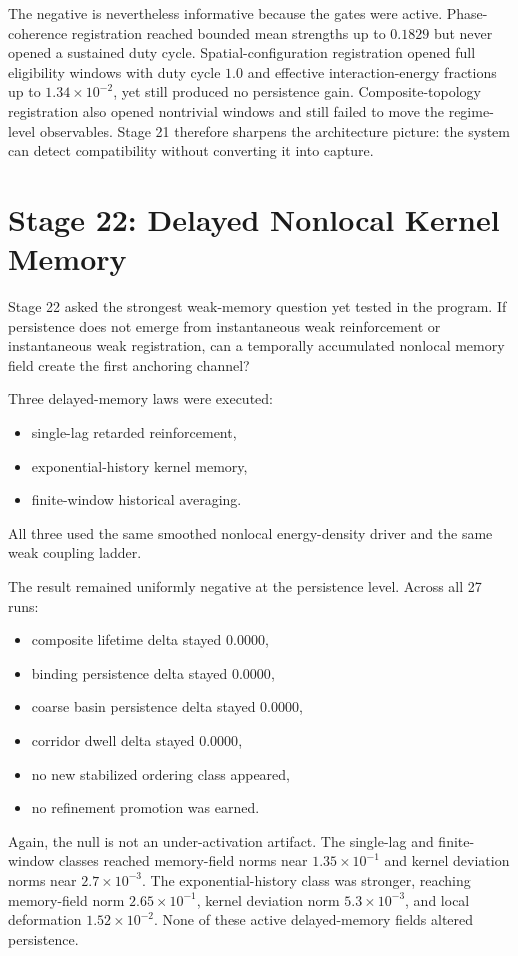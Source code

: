 \documentclass[11pt]{article}
\begin{document}
The negative is nevertheless informative because the gates were active. Phase-coherence registration reached bounded mean strengths up to $0.1829$ but never opened a sustained duty cycle. Spatial-configuration registration opened full eligibility windows with duty cycle $1.0$ and effective interaction-energy fractions up to $1.34\times10^{-2}$, yet still produced no persistence gain. Composite-topology registration also opened nontrivial windows and still failed to move the regime-level observables. Stage 21 therefore sharpens the architecture picture: the system can detect compatibility without converting it into capture.

\section{Stage 22: Delayed Nonlocal Kernel Memory}

Stage 22 asked the strongest weak-memory question yet tested in the program. If persistence does not emerge from instantaneous weak reinforcement or instantaneous weak registration, can a temporally accumulated nonlocal memory field create the first anchoring channel?

Three delayed-memory laws were executed:
\begin{itemize}
\item single-lag retarded reinforcement,
\item exponential-history kernel memory,
\item finite-window historical averaging.
\end{itemize}
All three used the same smoothed nonlocal energy-density driver and the same weak coupling ladder.

The result remained uniformly negative at the persistence level. Across all 27 runs:
\begin{itemize}
\item composite lifetime delta stayed $0.0000$,
\item binding persistence delta stayed $0.0000$,
\item coarse basin persistence delta stayed $0.0000$,
\item corridor dwell delta stayed $0.0000$,
\item no new stabilized ordering class appeared,
\item no refinement promotion was earned.
\end{itemize}

Again, the null is not an under-activation artifact. The single-lag and finite-window classes reached memory-field norms near $1.35\times10^{-1}$ and kernel deviation norms near $2.7\times10^{-3}$. The exponential-history class was stronger, reaching memory-field norm $2.65\times10^{-1}$, kernel deviation norm $5.3\times10^{-3}$, and local deformation $1.52\times10^{-2}$. None of these active delayed-memory fields altered persistence.
\end{document}
